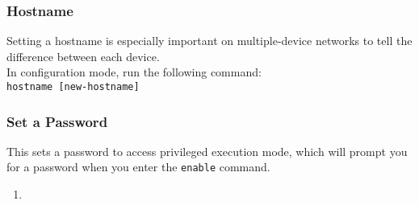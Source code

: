 \documentclass{ol-softwaremanual}
\begin{document}
            \subsubsection{Hostname}\label{subsubsec:hostname}
            Setting a hostname is especially important on multiple-device networks to tell the difference between each device.\\
            In configuration mode, run the following command:\\
            \verb|hostname [new-hostname]|
            \subsubsection{Set a Password}\label{subsubsec:passwrd}
            This sets a password to access privileged execution mode, which will prompt you for a password when you enter the \verb|enable| command.
    
        \begin{enumerate}
            \item
        \end{enumerate}
\end{document}
